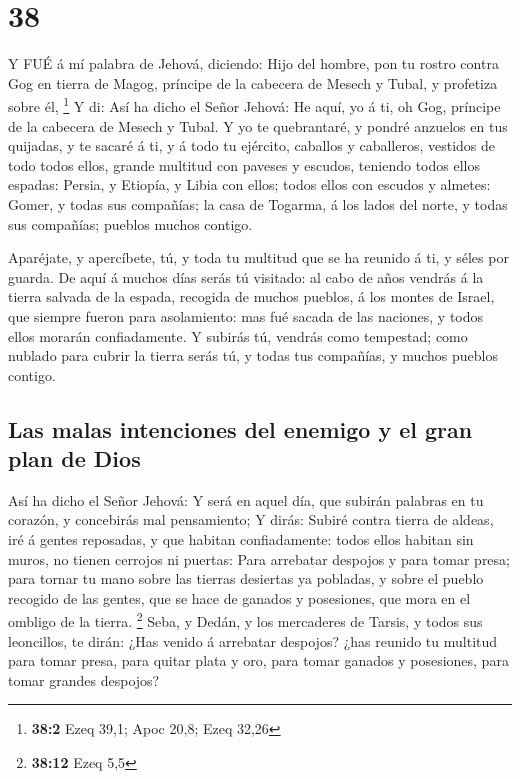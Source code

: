 \hypertarget{section-37}{%
\section{38}\label{section-37}}

 Y FUÉ á mí palabra de Jehová, diciendo:  Hijo
del hombre, pon tu rostro contra Gog en tierra de Magog, príncipe de la
cabecera de Mesech y Tubal, y profetiza sobre él, \footnote{\textbf{38:2}
  Ezeq 39,1; Apoc 20,8; Ezeq 32,26}  Y di: Así ha dicho el
Señor Jehová: He aquí, yo á ti, oh Gog, príncipe de la cabecera de
Mesech y Tubal.  Y yo te quebrantaré, y pondré anzuelos en
tus quijadas, y te sacaré á ti, y á todo tu ejército, caballos y
caballeros, vestidos de todo todos ellos, grande multitud con paveses y
escudos, teniendo todos ellos espadas:  Persia, y Etiopía, y
Libia con ellos; todos ellos con escudos y almetes:  Gomer,
y todas sus compañías; la casa de Togarma, á los lados del norte, y
todas sus compañías; pueblos muchos contigo.

 Aparéjate, y apercíbete, tú, y toda tu multitud que se ha
reunido á ti, y séles por guarda.  De aquí á muchos días
serás tú visitado: al cabo de años vendrás á la tierra salvada de la
espada, recogida de muchos pueblos, á los montes de Israel, que siempre
fueron para asolamiento: mas fué sacada de las naciones, y todos ellos
morarán confiadamente.  Y subirás tú, vendrás como
tempestad; como nublado para cubrir la tierra serás tú, y todas tus
compañías, y muchos pueblos contigo.

\hypertarget{las-malas-intenciones-del-enemigo-y-el-gran-plan-de-dios}{%
\subsection{Las malas intenciones del enemigo y el gran plan de
Dios}\label{las-malas-intenciones-del-enemigo-y-el-gran-plan-de-dios}}

 Así ha dicho el Señor Jehová: Y será en aquel día, que
subirán palabras en tu corazón, y concebirás mal pensamiento;
 Y dirás: Subiré contra tierra de aldeas, iré á gentes
reposadas, y que habitan confiadamente: todos ellos habitan sin muros,
no tienen cerrojos ni puertas:  Para arrebatar despojos y
para tomar presa; para tornar tu mano sobre las tierras desiertas ya
pobladas, y sobre el pueblo recogido de las gentes, que se hace de
ganados y posesiones, que mora en el ombligo de la tierra. \footnote{\textbf{38:12}
  Ezeq 5,5}  Seba, y Dedán, y los mercaderes de Tarsis, y
todos sus leoncillos, te dirán: ¿Has venido á arrebatar despojos? ¿has
reunido tu multitud para tomar presa, para quitar plata y oro, para
tomar ganados y posesiones, para tomar grandes despojos?

